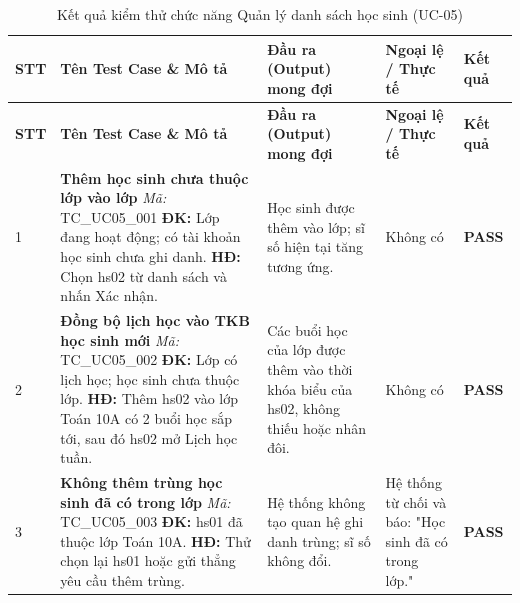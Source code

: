\vspace{0.4em}
\begin{longtable}{|>{\centering\arraybackslash}p{0.8cm}|>{\raggedright\arraybackslash}p{4.6cm}|>{\raggedright\arraybackslash}p{3.8cm}|>{\raggedright\arraybackslash}p{3.8cm}|>{\centering\arraybackslash}p{1.5cm}|}
\caption{Kết quả kiểm thử chức năng Quản lý danh sách học sinh (UC-05)}\label{tab:test-uc05}\\
\hline
\textbf{STT} & \textbf{Tên Test Case \& Mô tả} & \textbf{Đầu ra (Output) mong đợi} & \textbf{Ngoại lệ / Thực tế} & \textbf{Kết quả} \\
\hline
\endfirsthead
\hline
\textbf{STT} & \textbf{Tên Test Case \& Mô tả} & \textbf{Đầu ra (Output) mong đợi} & \textbf{Ngoại lệ / Thực tế} & \textbf{Kết quả} \\
\hline
\endhead

1 & \textbf{Thêm học sinh chưa thuộc lớp vào lớp} \newline\newline \textit{Mã:} TC\_UC05\_001 \newline\newline \textbf{ĐK:} Lớp đang hoạt động; có tài khoản học sinh chưa ghi danh. \newline \textbf{HĐ:} Chọn hs02 từ danh sách và nhấn Xác nhận. 
& Học sinh được thêm vào lớp; sĩ số hiện tại tăng tương ứng. 
& Không có 
& \textbf{PASS} \\
\hline

2 & \textbf{Đồng bộ lịch học vào TKB học sinh mới} \newline\newline \textit{Mã:} TC\_UC05\_002 \newline\newline \textbf{ĐK:} Lớp có lịch học; học sinh chưa thuộc lớp. \newline \textbf{HĐ:} Thêm hs02 vào lớp Toán 10A có 2 buổi học sắp tới, sau đó hs02 mở Lịch học tuần. 
& Các buổi học của lớp được thêm vào thời khóa biểu của hs02, không thiếu hoặc nhân đôi. 
& Không có 
& \textbf{PASS} \\
\hline

3 & \textbf{Không thêm trùng học sinh đã có trong lớp} \newline\newline \textit{Mã:} TC\_UC05\_003 \newline\newline \textbf{ĐK:} hs01 đã thuộc lớp Toán 10A. \newline \textbf{HĐ:} Thử chọn lại hs01 hoặc gửi thẳng yêu cầu thêm trùng. 
& Hệ thống không tạo quan hệ ghi danh trùng; sĩ số không đổi. 
& Hệ thống từ chối và báo: "Học sinh đã có trong lớp." 
& \textbf{PASS} \\
\hline


\end{longtable}
